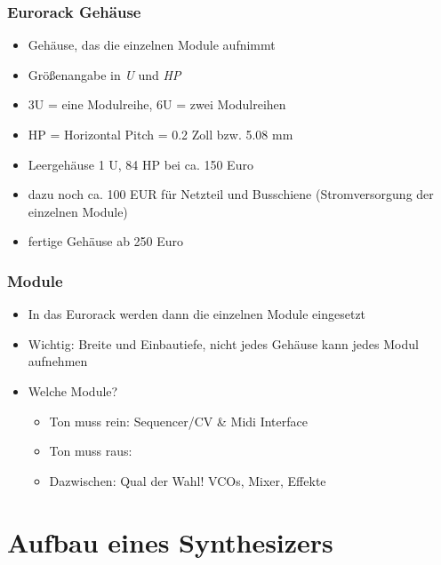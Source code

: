 \documentclass[11pt,ngerman]{beamer}
\begin{document}
\begin{frame}
\frametitle{Eurorack Gehäuse}

\begin{itemize}
\item Gehäuse, das die einzelnen Module aufnimmt
\item Größenangabe in \textit{U} und \textit{HP}
\item 3U = eine Modulreihe, 6U = zwei Modulreihen
\item HP = Horizontal Pitch = 0.2 Zoll bzw. 5.08 mm
\item Leergehäuse 1 U, 84 HP bei ca. 150 Euro
\item dazu noch ca. 100 EUR für Netzteil und Busschiene (Stromversorgung der einzelnen Module)
\item fertige Gehäuse ab 250 Euro
\end{itemize}
\end{frame}

\begin{frame}
\frametitle{Module}

\begin{itemize}
\item In das Eurorack werden dann die einzelnen Module eingesetzt
\item Wichtig: Breite und Einbautiefe, nicht jedes Gehäuse kann jedes Modul aufnehmen
\item Welche Module? 
\begin{itemize}
	\item Ton muss rein: Sequencer/CV \& Midi Interface
	\item Ton muss raus:
	\item Dazwischen: Qual der Wahl! VCOs, Mixer, Effekte
\end{itemize}
\end{itemize}
\end{frame}

\section{Aufbau eines Synthesizers}
\end{document}
